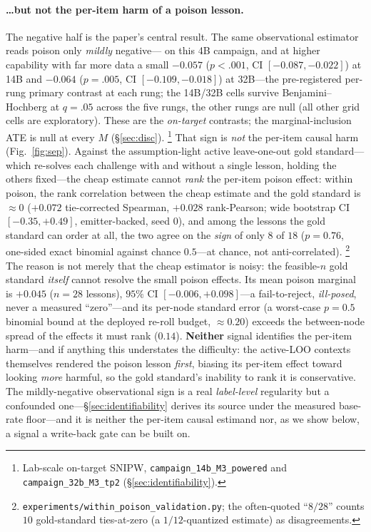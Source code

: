 \paragraph{\ldots but not the per-item harm of a poison lesson.} The negative half is
the paper's central result. The same observational estimator reads poison only
\emph{mildly} negative---\ObsAtePoison{} on this 4B campaign, and at higher capability
with far more data a small $-0.057$ ($p{<}.001$, CI $[-0.087,-0.022]$) at 14B and $-0.064$
($p{=}.005$, CI $[-0.109,-0.018]$) at 32B---the pre-registered per-rung primary contrast
at each rung; the 14B/32B cells survive Benjamini--Hochberg at $q{=}.05$ across the five
rungs, the other rungs are null (all other grid cells are exploratory). These are the \emph{on-target} contrasts; the marginal-inclusion ATE is null at
every $M$ (\S\ref{sec:disc}).%
\footnote{Lab-scale on-target SNIPW, \texttt{campaign\_14b\_M3\_powered} and \texttt{campaign\_32b\_M3\_tp2}
(\S\ref{sec:identifiability}).}
That sign is \emph{not} the per-item causal harm (Fig.~\ref{fig:sep}). Against the assumption-light active
leave-one-out gold standard---which re-solves each challenge with and without a single
lesson, holding the others fixed---the cheap estimate cannot \emph{rank} the per-item
poison effect: within poison, the rank correlation between the cheap estimate and the
gold standard is $\approx 0$ ($+0.072$ tie-corrected Spearman, $+0.028$ rank-Pearson;
wide bootstrap CI $[-0.35,+0.49]$, emitter-backed, seed 0), and among the lessons the
gold standard can order
at all, the two agree on the \emph{sign} of only $8$ of $18$ ($p{=}0.76$, one-sided
exact binomial against chance $0.5$---at chance,
not anti-correlated).%
\footnote{\texttt{experiments/within\_poison\_validation.py}; the often-quoted ``$8/28$''
counts $10$ gold-standard ties-at-zero (a $1/12$-quantized estimate) as disagreements.}
The reason is not merely that the cheap estimator is noisy: the feasible-$n$ gold
standard \emph{itself} cannot resolve the small poison effects. Its mean poison marginal
is $+0.045$ ($n{=}28$ lessons), $95\%$ CI $[-0.006,+0.098]$---a fail-to-reject,
\emph{ill-posed}, never a
measured ``zero''---and its per-node standard error (a worst-case $p{=}0.5$ binomial
bound at the deployed re-roll budget, $\approx0.20$) exceeds the between-node spread of
the effects it must rank ($0.14$). \textbf{Neither} signal
identifies the per-item harm---and if anything this understates the difficulty: the
active-LOO contexts themselves rendered the poison lesson \emph{first}, biasing its
per-item effect toward looking \emph{more} harmful, so the gold standard's inability to
rank it is conservative. The mildly-negative observational sign is a real
\emph{label-level} regularity but a confounded one---\S\ref{sec:identifiability} derives
its source under the measured base-rate floor---and it is neither the per-item causal
estimand nor, as we show below, a signal a write-back gate can be built on.

